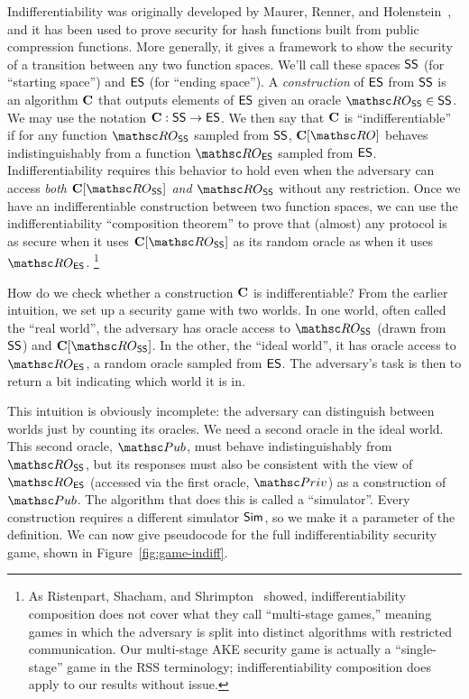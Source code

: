 Indifferentiability was originally developed by Maurer, Renner, and Holenstein~\cite{TCC:MauRenHol04}, and it has been used to prove security for hash functions built from public compression functions.
More generally, it gives a framework to show the security of a transition between any two function spaces.
We'll call these spaces $\mathsf{SS}$ (for ``starting space'') and $\mathsf{ES}$ (for ``ending space'').
A \textit{construction} of $\mathsf{ES}$ from $\mathsf{SS}$ is an algorithm $\mathbf{C}$ that outputs elements of $\mathsf{ES}$ given an oracle $\RO_{\SSp} \in \SSp$. 
We may use the notation $\mathbf{C}:\mathsf{SS} \to \mathsf{ES}$.
We then say that $\mathbf{C}$ is ``indifferentiable'' if for any function $\RO_{\SSp}$ sampled from $\mathsf{SS}$, $\construct{C}[\RO]$ behaves indistinguishably from a function $\RO_{\ESp}$ sampled from $\mathsf{ES}$.
Indifferentiability requires this behavior to hold even when the adversary can access \emph{both $\construct{C}[\RO_{\SSp}]$ and $\RO_{\SSp}$} without any restriction. 
%
Once we have an indifferentiable construction between two function spaces, we can use the indifferentiability ``composition theorem'' to prove that (almost) any protocol is as secure when it uses $\construct{C}[\RO_{\SSp}]$ as its random oracle as when it uses $\RO_{\ESp}$.%
\footnote{As Ristenpart, Shacham, and Shrimpton~\cite{EC:RisShaShr11} showed, indifferentiability composition does not cover what they call ``multi-stage games,'' meaning games in which the adversary is split into distinct algorithms with restricted communication. Our multi-stage AKE security game is actually a ``single-stage'' game in the RSS terminology; indifferentiability composition does apply to our results without issue.}

How do we check whether a construction $\mathbf{C}$ is indifferentiable?
From the earlier intuition, we set up a security game with two worlds.
In one world, often called the ``real world'', the adversary has oracle access to $\RO_{\SSp}$ (drawn from $\mathsf{SS}$) and $\construct{C}[\RO_{\SSp}]$.
In the other, the ``ideal world'', it has oracle access to $\RO_{\ESp}$, a random oracle sampled from $\mathsf{ES}$.
The adversary's task is then to return a bit indicating which world it is in.

This intuition is obviously incomplete:
the adversary can distinguish between worlds just by counting its oracles.
We need a second oracle in the ideal world.
This second oracle, $\PubO$, must behave indistinguishably from $\RO_{\SSp}$, but its responses must also be consistent with the view of $\RO_{\ESp}$ (accessed via the first oracle, $\PrivO$) as a construction of $\PubO$.
The algorithm that does this is called a ``simulator''.
Every construction requires a different simulator $\mathsf{Sim}$, so we make it a parameter of the definition.
We can now give pseudocode for the full indifferentiability security game, shown in Figure~\ref{fig:game-indiff}.

